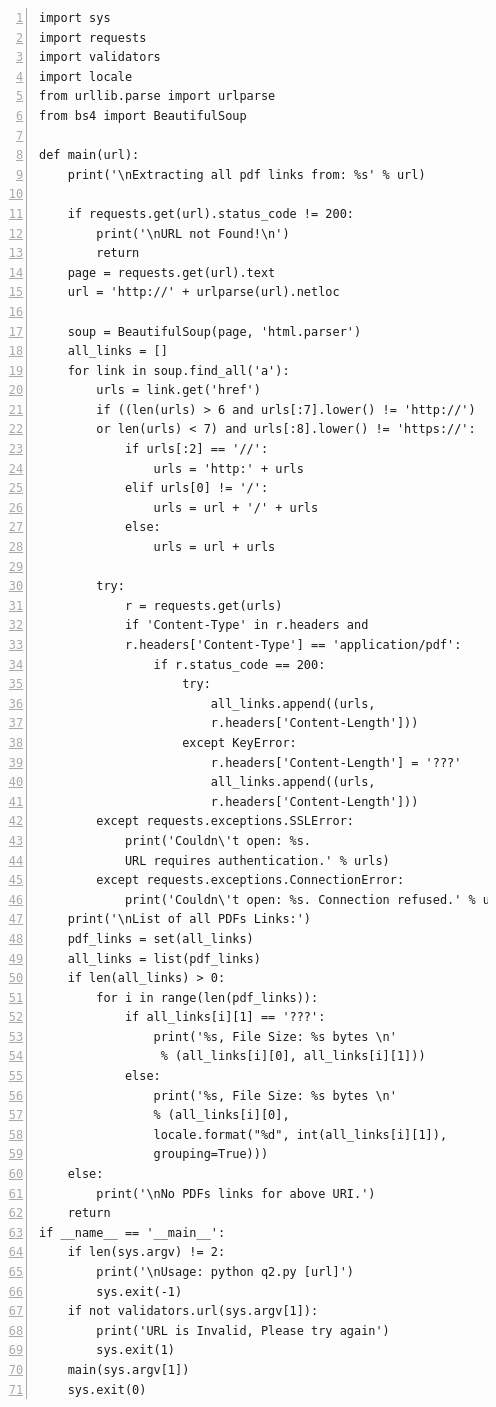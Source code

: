 \begin{lstlisting}[frame = single,breaklines=true,numbers=left]
import sys
import requests
import validators
import locale
from urllib.parse import urlparse
from bs4 import BeautifulSoup

def main(url):
    print('\nExtracting all pdf links from: %s' % url)

    if requests.get(url).status_code != 200:
        print('\nURL not Found!\n')
        return
    page = requests.get(url).text
    url = 'http://' + urlparse(url).netloc
	
    soup = BeautifulSoup(page, 'html.parser')
    all_links = []
    for link in soup.find_all('a'):
        urls = link.get('href')
        if ((len(urls) > 6 and urls[:7].lower() != 'http://') 
        or len(urls) < 7) and urls[:8].lower() != 'https://':
            if urls[:2] == '//':
                urls = 'http:' + urls
            elif urls[0] != '/':    
                urls = url + '/' + urls
            else:
                urls = url + urls

        try:
            r = requests.get(urls)
            if 'Content-Type' in r.headers and 
            r.headers['Content-Type'] == 'application/pdf':
                if r.status_code == 200:
                    try:
                        all_links.append((urls, 
                        r.headers['Content-Length']))
                    except KeyError:
                        r.headers['Content-Length'] = '???'
                        all_links.append((urls, 
                        r.headers['Content-Length']))
        except requests.exceptions.SSLError:
            print('Couldn\'t open: %s. 
            URL requires authentication.' % urls)
        except requests.exceptions.ConnectionError:
            print('Couldn\'t open: %s. Connection refused.' % urls)
    print('\nList of all PDFs Links:')
    pdf_links = set(all_links)
    all_links = list(pdf_links)
    if len(all_links) > 0:
        for i in range(len(pdf_links)):
            if all_links[i][1] == '???':
                print('%s, File Size: %s bytes \n'
                 % (all_links[i][0], all_links[i][1]))
            else:
                print('%s, File Size: %s bytes \n' 
                % (all_links[i][0],                                  
                locale.format("%d", int(all_links[i][1]),
                grouping=True)))
    else:
        print('\nNo PDFs links for above URI.')
    return
if __name__ == '__main__':
    if len(sys.argv) != 2:
        print('\nUsage: python q2.py [url]')
        sys.exit(-1)
    if not validators.url(sys.argv[1]):
        print('URL is Invalid, Please try again')
        sys.exit(1)
    main(sys.argv[1])
    sys.exit(0)
\end{lstlisting}

